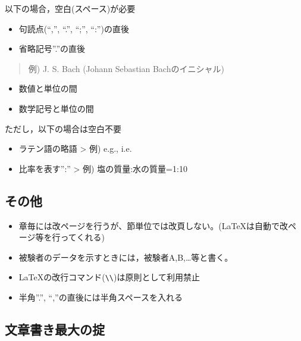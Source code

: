 \documentclass[12pt, ]{jsarticle}
\providecommand{\tightlist}{%
   \setlength{\itemsep}{0pt}\setlength{\parskip}{0pt}}
\begin{document}
以下の場合，空白(スペース)が必要

\begin{itemize}
\tightlist
\item
  句読点(``,'', ``.'', ``;'', ``:'')の直後
\item
  省略記号''.''の直後
\end{itemize}

\begin{quote}
例) J. S. Bach (Johann Sebastian Bachのイニシャル)
\end{quote}

\begin{itemize}
\tightlist
\item
  数値と単位の間
\item
  数学記号と単位の間
\end{itemize}

ただし，以下の場合は空白不要

\begin{itemize}
\item
  ラテン語の略語 \textgreater{} 例) e.g., i.e.
\item
  比率を表す'':'' \textgreater{} 例) 塩の質量:水の質量=1:10
\end{itemize}

\hypertarget{ux305dux306eux4ed6}{%
\subsection{その他}\label{ux305dux306eux4ed6}}

\begin{itemize}
\tightlist
\item
  章毎には改ページを行うが、節単位では改頁しない。(LaTeXは自動で改ページ等を行ってくれる)
\item
  被験者のデータを示すときには，被験者A,B,\ldots 等と書く。
\item
  LaTeXの改行コマンド(\passthrough{\lstinline!\\\\!})は原則として利用禁止
\item
  半角''.'', ``,''の直後には半角スペースを入れる
\end{itemize}

\hypertarget{ux6587ux7ae0ux66f8ux304dux6700ux5927ux306eux639f}{%
\subsection{文章書き最大の掟}\label{ux6587ux7ae0ux66f8ux304dux6700ux5927ux306eux639f}}
\end{document}
